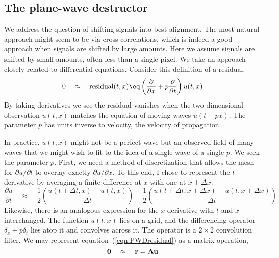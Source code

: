 %	
	
%

\subsection{The plane-wave destructor}
%
We address the question of shifting signals into best alignment. The
most natural approach might seem to be via cross correlations, which
is indeed a good approach when signals are shifted by large amounts.
Here we assume signals are shifted by small amounts, often less than a
single pixel.  We take an approach closely related to differential
equations. Consider this definition of a residual.
\begin{equation}
0 \quad \approx \quad \hbox{residual}(t,x) \eq \left( \frac{\partial}{\partial x} + p \frac{\partial}{\partial t} \right) u(t,x)
\label{eqn:PWDresidual}
\end{equation}
By taking derivatives we see the residual vanishes when the two-dimensional observation $u(t,x)$ matches the equation of moving waves $u(t-px)$.  The parameter $p$ has units inverse to velocity, the velocity of propagation. 
\par
In practice, $u(t,x)$ might not be a perfect wave but an observed field of many waves that we might wish to fit to the idea of a single wave of a single $p$. We seek the parameter $p$.  First, we need a method of discretization that allows the mesh for $\partial u/\partial t$ to overlay exactly $\partial u /\partial x$.  To this end, I chose to represent the $t$-derivative by averaging a finite difference at $x$ with one at $x+\Delta x$. 
\begin{equation}
\frac{\partial u}{\partial t} \quad \approx \quad \frac{1}{2} 
\left(
\frac{u(t+\Delta t,x) - u(t,x) }{\Delta t}
\right) + \frac{1}{2}
\left(
\frac{u(t+\Delta t,x+\Delta x) - u(t,x+\Delta x) }{\Delta t}
\right)
\end{equation}
Likewise, there is an analogous expression for the $x$-derivative with $t$ and $x$ interchanged.
The function $u(t,x)$ lies on a grid, and the
differencing operator $\delta_x + p\delta_t$ lies atop it and convolves across it.
The operator is a $2\times 2$ convolution filter.
We may represent equation~(\ref{eqn:PWDresidual}) as a matrix operation,
\begin{equation}
{\bf 0} \quad \approx\quad  {\bf r} = {\bf A}{\bf u}
\end{equation}
